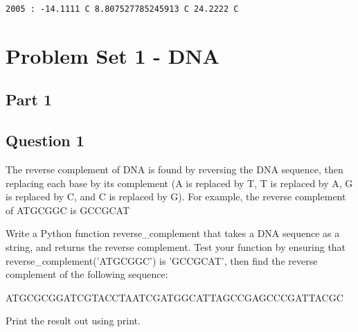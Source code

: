 \documentclass[11pt]{article}
\begin{document}
    \begin{Verbatim}[commandchars=\\\{\}]
2005 : -14.1111 C 8.807527785245913 C 24.2222 C
    \end{Verbatim}

    \section{Problem Set 1 - DNA}\label{problem-set-1---dna}

    \subsection{Part 1}\label{part-1}

    \subsection{Question 1}\label{question-1}

The reverse complement of DNA is found by reversing the DNA sequence,
then replacing each base by its complement (A is replaced by T, T is
replaced by A, G is replaced by C, and C is replaced by G). For example,
the reverse complement of ATGCGGC is GCCGCAT

Write a Python function reverse\_complement that takes a DNA sequence as
a string, and returns the reverse complement. Test your function by
ensuring that reverse\_complement('ATGCGGC') is 'GCCGCAT', then find the
reverse complement of the following sequence:

ATGCGCGGATCGTACCTAATCGATGGCATTAGCCGAGCCCGATTACGC

Print the result out using print.
\end{document}
